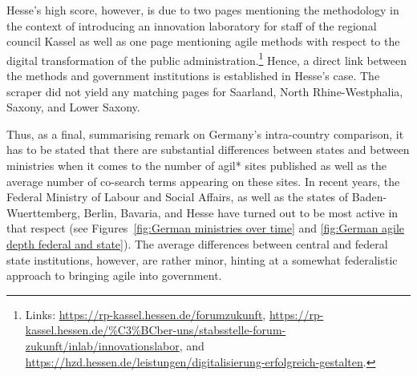 \noindent Hesse's high score, however, is due to two pages mentioning the methodology in the context of introducing an innovation laboratory for staff of the regional council Kassel as well as one page mentioning agile methods with respect to the digital transformation of the public administration.\footnote{Links: \url{https://rp-kassel.hessen.de/forumzukunft}, \url{https://rp-kassel.hessen.de/\%C3\%BCber-uns/stabsstelle-forum-zukunft/inlab/innovationslabor}, and \url{https://hzd.hessen.de/leistungen/digitalisierung-erfolgreich-gestalten}.} Hence, a direct link between the methods and government institutions is established in Hesse's case. The scraper did not yield any matching pages for Saarland, North Rhine-Westphalia, Saxony, and Lower Saxony.

Thus, as a final, summarising remark on Germany's intra-country comparison, it has to be stated that there are substantial differences between states and between ministries when it comes to the number of agil* sites published as well as the average number of co-search terms appearing on these sites. In recent years, the Federal Ministry of Labour and Social Affairs, as well as the states of Baden-Wuerttemberg, Berlin, Bavaria, and Hesse have turned out to be most active in that respect (see Figures~\ref{fig:German ministries over time} and \ref{fig:German agile depth federal and state}). The average differences between central and federal state institutions, however, are rather minor, hinting at a somewhat federalistic approach to bringing agile into government.

